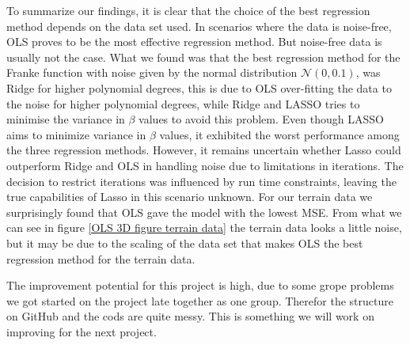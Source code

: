 \thispagestyle{plain}
\noindent To summarize our findings, it is clear that the choice of the best regression method depends on the data set used. In scenarios where the data is noise-free, OLS proves to be the most effective regression method. But noise-free data is usually not the case. What we found was that the best regression method for the Franke function with noise given by the normal distribution $\mathcal{N}(0, 0.1)$, was Ridge for higher polynomial degrees, this is due to OLS over-fitting the data to the noise for higher polynomial degrees, while Ridge and LASSO tries to minimise the variance in $\beta$ values to avoid this problem. 
Even though LASSO aims to minimize variance in $\beta$ values, it exhibited the worst performance among the three regression methods. However, it remains uncertain whether Lasso could outperform Ridge and OLS in handling noise due to limitations in iterations. The decision to restrict iterations was influenced by run time constraints, leaving the true capabilities of Lasso in this scenario unknown.
\noindent For our terrain data we surprisingly found that OLS gave the model with the lowest MSE. From what we can see in figure \eqref{OLS 3D figure terrain data} the terrain data looks a little noise, but it may be due to the scaling of the data set that makes OLS the best regression method for the terrain data. 

\noindent The improvement potential for this project is high, due to some grope problems we got started on the project late together as one group. Therefor the structure on GitHub and the cods are quite messy. This is something we will work on improving for the next project. 